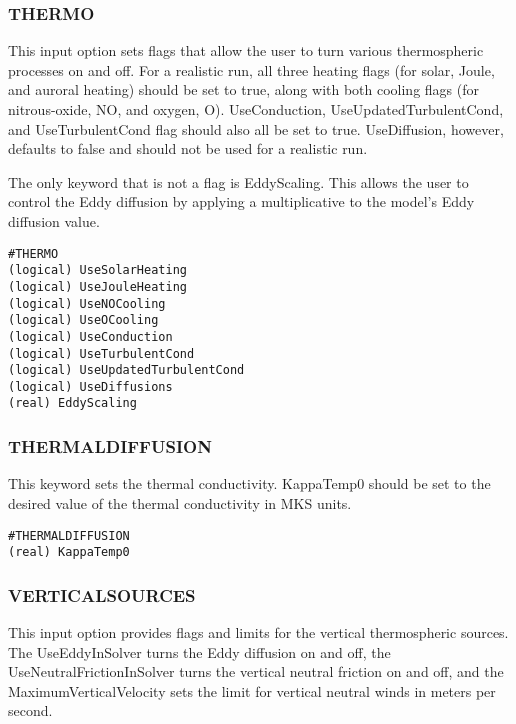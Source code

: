 \subsubsection{THERMO}
\label{thermo.sec}

This input option sets flags that allow the user to turn various thermospheric processes on and off.  For a realistic run, all three heating flags (for solar, Joule, and auroral heating) should be set to true, along with both cooling flags (for nitrous-oxide, NO, and oxygen, O).  UseConduction, UseUpdatedTurbulentCond, and UseTurbulentCond flag should also all be set to true.  UseDiffusion, however, defaults to false and should not be used for a realistic run.

The only keyword that is not a flag is EddyScaling.  This allows the user to control the Eddy diffusion by applying a multiplicative to the model's Eddy diffusion value.

\begin{verbatim}
#THERMO
(logical) UseSolarHeating   
(logical) UseJouleHeating   
(logical) UseNOCooling    
(logical) UseOCooling       
(logical) UseConduction     
(logical) UseTurbulentCond  
(logical) UseUpdatedTurbulentCond
(logical) UseDiffusions
(real) EddyScaling  
\end{verbatim}

\subsubsection{THERMALDIFFUSION}
\label{thermaldiffusion.sec}

This keyword sets the thermal conductivity.  KappaTemp0 should be set to the desired value of the thermal conductivity in MKS units.

\begin{verbatim}
#THERMALDIFFUSION
(real) KappaTemp0
\end{verbatim}

\subsubsection{VERTICALSOURCES}
\label{verticalsources.sec}

This input option provides flags and limits for the vertical thermospheric sources.  The UseEddyInSolver turns the Eddy diffusion on and off, the UseNeutralFrictionInSolver turns the vertical neutral friction on and off, and the MaximumVerticalVelocity sets the limit for vertical neutral winds in meters per second.

